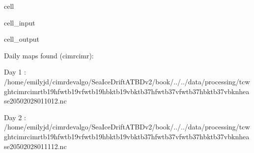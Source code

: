 \documentclass[letterpaper,10pt,english]{jupyterBook}
\begin{document}
\begin{sphinxuseclass}{cell}
\begin{sphinxVerbatimInput}
\begin{sphinxuseclass}{cell_input}
\end{sphinxuseclass}\end{sphinxVerbatimInput}
\begin{sphinxVerbatimOutput}

\begin{sphinxuseclass}{cell_output}
\begin{sphinxVerbatim}[commandchars=\\\{\}]
Daily maps found (cimr\PYGZhy{}cimr):

	Day 1 : /home/emilyjd/cimr\PYGZhy{}devalgo/SeaIceDrift\PYGZus{}ATBD\PYGZus{}v2/book/../../data/processing/tc\PYGZus{}wght\PYGZus{}cimr\PYGZhy{}cimr\PYGZus{}tb19hfw\PYGZhy{}tb19vfw\PYGZhy{}tb19hbk\PYGZhy{}tb19vbk\PYGZhy{}tb37hfw\PYGZhy{}tb37vfw\PYGZhy{}tb37hbk\PYGZhy{}tb37vbk\PYGZus{}nh\PYGZhy{}ease2\PYGZhy{}050\PYGZus{}2028011012.nc 

	Day 2 : /home/emilyjd/cimr\PYGZhy{}devalgo/SeaIceDrift\PYGZus{}ATBD\PYGZus{}v2/book/../../data/processing/tc\PYGZus{}wght\PYGZus{}cimr\PYGZhy{}cimr\PYGZus{}tb19hfw\PYGZhy{}tb19vfw\PYGZhy{}tb19hbk\PYGZhy{}tb19vbk\PYGZhy{}tb37hfw\PYGZhy{}tb37vfw\PYGZhy{}tb37hbk\PYGZhy{}tb37vbk\PYGZus{}nh\PYGZhy{}ease2\PYGZhy{}050\PYGZus{}2028011112.nc 
\end{sphinxVerbatim}


\end{sphinxuseclass}
\end{sphinxVerbatimOutput}
\end{sphinxuseclass}
\end{document}
